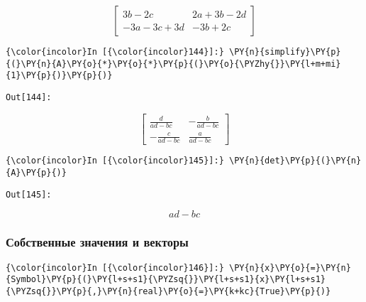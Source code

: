     \[\left[\begin{matrix}3 b - 2 c & 2 a + 3 b - 2 d\\- 3 a - 3 c + 3 d & - 3 b + 2 c\end{matrix}\right]\]

    

    \begin{Verbatim}[commandchars=\\\{\}]
{\color{incolor}In [{\color{incolor}144}]:} \PY{n}{simplify}\PY{p}{(}\PY{n}{A}\PY{o}{*}\PY{o}{*}\PY{p}{(}\PY{o}{\PYZhy{}}\PY{l+m+mi}{1}\PY{p}{)}\PY{p}{)}
\end{Verbatim}
\texttt{\color{outcolor}Out[{\color{outcolor}144}]:}
    
    \[\left[\begin{matrix}\frac{d}{a d - b c} & - \frac{b}{a d - b c}\\- \frac{c}{a d - b c} & \frac{a}{a d - b c}\end{matrix}\right]\]

    

    \begin{Verbatim}[commandchars=\\\{\}]
{\color{incolor}In [{\color{incolor}145}]:} \PY{n}{det}\PY{p}{(}\PY{n}{A}\PY{p}{)}
\end{Verbatim}
\texttt{\color{outcolor}Out[{\color{outcolor}145}]:}
    
    \[a d - b c\]

    

\subsubsection{Собственные значения и векторы}
\label{sympy13}

    \begin{Verbatim}[commandchars=\\\{\}]
{\color{incolor}In [{\color{incolor}146}]:} \PY{n}{x}\PY{o}{=}\PY{n}{Symbol}\PY{p}{(}\PY{l+s+s1}{\PYZsq{}}\PY{l+s+s1}{x}\PY{l+s+s1}{\PYZsq{}}\PY{p}{,}\PY{n}{real}\PY{o}{=}\PY{k+kc}{True}\PY{p}{)}
\end{Verbatim}

